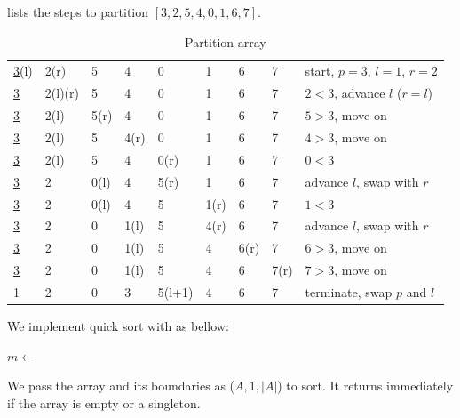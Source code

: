 \documentclass[b5paper]{article}
\begin{document}
 lists the steps to partition $[3, 2, 5, 4, 0, 1, 6, 7]$.

\begin{table}[htbp]
\centering
\begin{tabular}{|llllllll|l|}
\hline
\underline{3}(l)  & 2(r) & 5 & 4 & 0 & 1 & 6 & 7 & start, $p = 3$, $l = 1$, $r = 2$ \\
\underline{3} & 2(l)(r) & 5 & 4 & 0 & 1 & 6 & 7 & $2 < 3$, advance $l$ ($r=l$) \\
\underline{3} & 2(l) & 5(r) & 4 & 0 & 1 & 6 & 7 & $5 > 3$, move on \\
\underline{3} & 2(l) & 5 & 4(r) & 0 & 1 & 6 & 7 & $4 > 3$, move on \\
\underline{3} & 2(l) & 5 & 4 & 0(r) & 1 & 6 & 7 & $0 < 3$ \\
\underline{3} & 2 & 0(l) & 4 & 5(r) & 1 & 6 & 7 & advance $l$, swap with $r$ \\
\underline{3} & 2 & 0(l) & 4 & 5 & 1(r) & 6 & 7 & $1 < 3$ \\
\underline{3} & 2 & 0 & 1(l) & 5 & 4(r) & 6 & 7 & advance $l$, swap with $r$ \\
\underline{3} & 2 & 0 & 1(l) & 5 & 4 & 6(r) & 7 & $6 > 3$, move on \\
\underline{3} & 2 & 0 & 1(l) & 5 & 4 & 6 & 7(r) & $7 > 3$, move on \\
1 & 2 & 0 & 3 & 5(l+1) & 4 & 6 & 7 & terminate, swap $p$ and $l$ \\
\hline
\end{tabular}
\caption{Partition array} \label{tab:partition-steps}
\end{table}

We implement quick sort with  as bellow:

\begin{algorithmic}[1]
    \State $m \gets$ 
    \State {}
    \State {}
  \EndIf
\EndProcedure
\end{algorithmic}

We pass the array and its boundaries as ($A, 1, |A|$) to sort. It returns immediately if the array is empty or a singleton.

\begin{Exercise}\label{ex:basic-qsort}
\end{Exercise}
\end{document}
